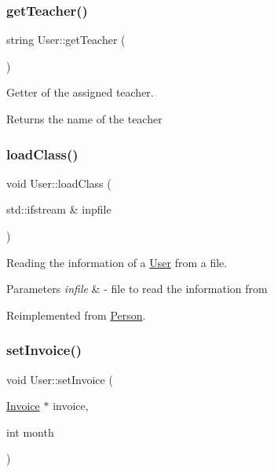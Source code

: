 \subsubsection{\texorpdfstring{get\+Teacher()}{getTeacher()}}
{\footnotesize\ttfamily string User\+::get\+Teacher (\begin{DoxyParamCaption}{ }\end{DoxyParamCaption})}



Getter of the assigned teacher. 

\begin{DoxyReturn}{Returns}
the name of the teacher 
\end{DoxyReturn}
\mbox{\label{class_user_abc12a9ca668bd860a3d6d2ae4791997d}} 
\subsubsection{\texorpdfstring{load\+Class()}{loadClass()}}
{\footnotesize\ttfamily void User\+::load\+Class (\begin{DoxyParamCaption}\item[{std\+::ifstream \&}]{inpfile }\end{DoxyParamCaption})\hspace{0.3cm}{\ttfamily [virtual]}}



Reading the information of a \mbox{\hyperlink{class_user}{User}} from a file. 


\begin{DoxyParams}{Parameters}
{\em infile} & -\/ file to read the information from \\
\hline
\end{DoxyParams}


Reimplemented from \mbox{\hyperlink{class_person_af07a032df8d56dddade4dc43960b536b}{Person}}.

\mbox{\label{class_user_ad0432b83c7379ca57ed782d2929f3b8a}} 
\subsubsection{\texorpdfstring{set\+Invoice()}{setInvoice()}}
{\footnotesize\ttfamily void User\+::set\+Invoice (\begin{DoxyParamCaption}\item[{\mbox{\hyperlink{class_invoice}{Invoice}} $\ast$}]{invoice,  }\item[{int}]{month }\end{DoxyParamCaption})}

